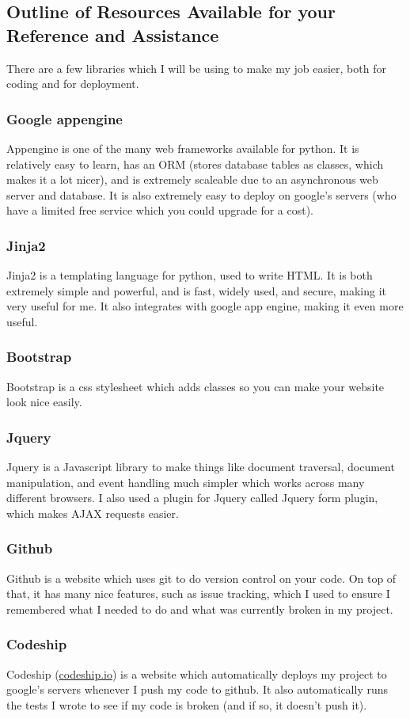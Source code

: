\subsection{Outline of Resources Available for your Reference and Assistance}
There are a few libraries which I will be using to make my job easier, both for coding and for deployment.

\subsubsection{Google appengine}
Appengine is one of the many web frameworks available for python. It is relatively easy to learn, has an ORM (stores database tables as classes, which makes it a lot nicer), and is extremely scaleable due to an asynchronous web server and database. It is also extremely easy to deploy on google's servers (who have a limited free service which you could upgrade for a cost).
	
\subsubsection{Jinja2}
Jinja2 is a templating language for python, used to write HTML. It is both extremely simple and powerful, and is fast, widely used, and secure, making it very useful for me. It also integrates with google app engine, making it even more useful.

\subsubsection{Bootstrap}
Bootstrap is a css stylesheet which adds classes so you can make your website look nice easily.

\subsubsection{Jquery}
Jquery is a Javascript library to make things like document traversal, document manipulation, and event handling much simpler which works across many different browsers. I also used a plugin for Jquery called Jquery form plugin, which makes AJAX requests easier.

\subsubsection{Github}
Github is a website which uses git to do version control on your code. On top of that, it has many nice features, such as issue tracking, which I used to ensure I remembered what I needed to do and what was currently broken in my project.

\subsubsection{Codeship}
Codeship (\url{codeship.io}) is a website which automatically deploys my project to google's servers whenever I push my code to github. It also automatically runs the tests I wrote to see if my code is broken (and if so, it doesn't push it).